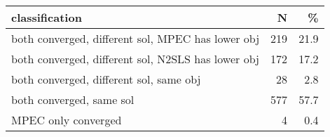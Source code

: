 \begin{table}
\centering
\begin{tabular}[t]{lrr}
\toprule
classification & N & \%\\
\midrule
both converged, different sol, MPEC has lower obj & 219 & 21.9\\
both converged, different sol, N2SLS has lower obj & 172 & 17.2\\
both converged, different sol, same obj & 28 & 2.8\\
both converged, same sol & 577 & 57.7\\
MPEC only converged & 4 & 0.4\\
\bottomrule
\end{tabular}
\end{table}
